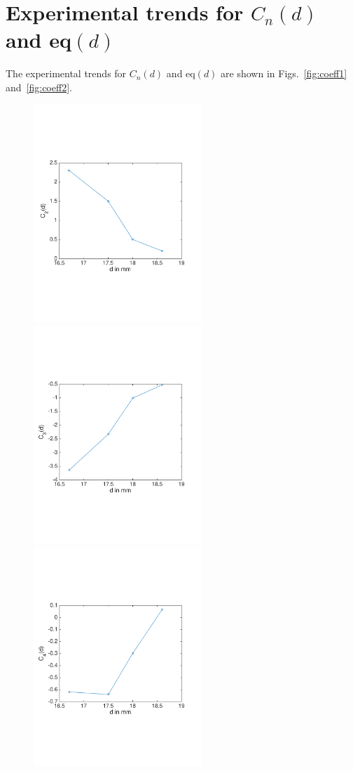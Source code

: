 \documentclass[10pt]{article}
\begin{document}
\section{Experimental trends for $C_n(d)$ and eq$(d)$}
The experimental trends for $C_n(d)$ and eq$(d)$ are shown in Figs.~\ref{fig:coeff1} and~\ref{fig:coeff2}. 
\begin{figure}[h] 
\centering
\includegraphics[width=2.5in]{variationC_2}
\includegraphics[width=2.5in]{variationC_3}
\includegraphics[width=2.5in]{variationC_4}

\end{figure}
\end{document}
